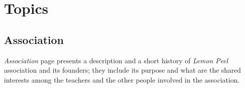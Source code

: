 \documentclass[../../DD.tex]{subfiles}
\begin{document}
\section{Topics}
	\subsection{Association}
		\textit{Association} page presents a description and a short history of \textit{Lemon Peel} association and its founders; they include its purpose and what are the shared interests among the teachers and the other people involved in the association.

\end{document}
